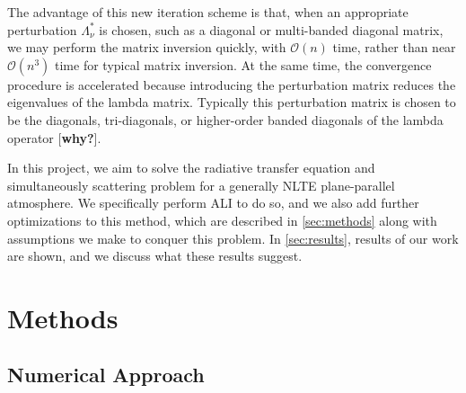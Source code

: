 \documentclass[12pt]{article}
\begin{document}
The advantage of this new iteration scheme is that, when an appropriate perturbation $\Lambda^*_\nu$ is chosen, such as a diagonal or multi-banded diagonal matrix, we may perform the matrix inversion quickly, with $\mathcal{O}(n)$ time, rather than near $\mathcal{O}(n^3)$ time for typical matrix inversion. At the same time, the convergence procedure is accelerated because introducing the perturbation matrix reduces the eigenvalues of the lambda matrix. Typically this perturbation matrix is chosen to be the diagonals, tri-diagonals, or higher-order banded diagonals of the lambda operator [\textbf{why?}].

In this project, we aim to solve the radiative transfer equation and simultaneously scattering problem for a generally NLTE plane-parallel atmosphere. We specifically perform ALI to do so, and we also add further optimizations to this method, which are described in \autoref{sec:methods} along with assumptions we make to conquer this problem. In \autoref{sec:results}, results of our work are shown, and we discuss what these results suggest.


\section{Methods}
\label{sec:methods}


\subsection{Numerical Approach}
\label{sec:numerical_approach}
\end{document}
